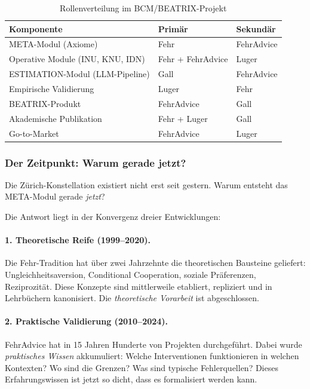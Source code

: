\begin{table}[h]
\centering
\caption{Rollenverteilung im BCM/BEATRIX-Projekt}
\begin{tabular}{@{}lll@{}}
\toprule
\textbf{Komponente} & \textbf{Primär} & \textbf{Sekundär} \\
\midrule
META-Modul (Axiome) & Fehr & FehrAdvice \\
Operative Module (INU, KNU, IDN) & Fehr + FehrAdvice & Luger \\
ESTIMATION-Modul (LLM-Pipeline) & Gall & FehrAdvice \\
Empirische Validierung & Luger & Fehr \\
BEATRIX-Produkt & FehrAdvice & Gall \\
Akademische Publikation & Fehr + Luger & Gall \\
Go-to-Market & FehrAdvice & Luger \\
\bottomrule
\end{tabular}
\end{table}

\subsubsection{Der Zeitpunkt: Warum gerade jetzt?}

Die Zürich-Konstellation existiert nicht erst seit gestern. Warum entsteht das \BCM{} META-Modul gerade \textit{jetzt}?

Die Antwort liegt in der Konvergenz dreier Entwicklungen:

\paragraph{1. Theoretische Reife (1999--2020).}

Die Fehr-Tradition hat über zwei Jahrzehnte die theoretischen Bausteine geliefert: Ungleichheitsaversion, Conditional Cooperation, soziale Präferenzen, Reziprozität. Diese Konzepte sind mittlerweile etabliert, repliziert und in Lehrbüchern kanonisiert. Die \textit{theoretische Vorarbeit} ist abgeschlossen.

\paragraph{2. Praktische Validierung (2010--2024).}

FehrAdvice hat in 15 Jahren Hunderte von Projekten durchgeführt. Dabei wurde \textit{praktisches Wissen} akkumuliert: Welche Interventionen funktionieren in welchen Kontexten? Wo sind die Grenzen? Was sind typische Fehlerquellen? Dieses Erfahrungswissen ist jetzt so dicht, dass es formalisiert werden kann.

